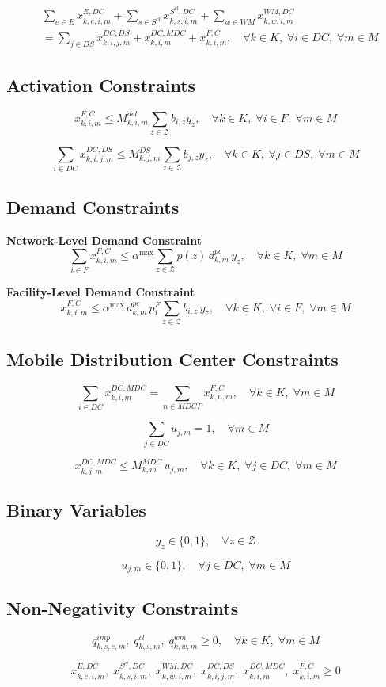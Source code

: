 \documentclass[12pt]{article}
\begin{document}
\begin{align*}
& \sum_{e \in E} x^{E,DC}_{k,e,i,m}
+ \sum_{s \in S^{cl}} x^{S^{cl},DC}_{k,s,i,m}
+ \sum_{w \in WM} x^{WM,DC}_{k,w,i,m} \\
& =
\sum_{j \in DS} x^{DC,DS}_{k,i,j,m}
+ x^{DC,MDC}_{k,i,m}
+ x^{F,C}_{k,i,m},
\quad \forall k \in K,\; \forall i \in DC,\; \forall m \in M
\end{align*}

\subsection{Activation Constraints}

\[
x^{F,C}_{k,i,m}
\leq
M^{del}_{k,i,m}
\sum_{z \in \mathcal{Z}} b_{i,z} y_z,
\quad \forall k \in K,\; \forall i \in F,\; \forall m \in M
\]

\[
\sum_{i \in DC} x^{DC,DS}_{k,i,j,m}
\leq
M^{DS}_{k,j,m}
\sum_{z \in \mathcal{Z}} b_{j,z} y_z,
\quad \forall k \in K,\; \forall j \in DS,\; \forall m \in M
\]

\subsection{Demand Constraints}

\textbf{Network-Level Demand Constraint}
\[
\sum_{i \in F} x^{F,C}_{k,i,m}
\le
\alpha^{\max}
\sum_{z \in \mathcal{Z}} p(z)\, d^{pc}_{k,m}\, y_z,
\quad \forall k \in K,\; \forall m \in M
\]

\textbf{Facility-Level Demand Constraint}
\[
x^{F,C}_{k,i,m}
\le
\alpha^{\max}\, d^{pc}_{k,m}\, p_i^{F}
\sum_{z \in \mathcal{Z}} b_{i,z} \, y_z,
\quad \forall k \in K,\; \forall i \in F,\; \forall m \in M
\]

\subsection{Mobile Distribution Center Constraints}

\[
\sum_{i \in DC} x^{DC,MDC}_{k,i,m}
=
\sum_{n \in MDCP} x^{F,C}_{k,n,m},
\quad \forall k \in K,\; \forall m \in M
\]

\[
\sum_{j \in DC} u_{j,m} = 1,
\quad \forall m \in M
\]

\[
x^{DC,MDC}_{k,j,m}
\leq
M^{MDC}_{k,m}\,u_{j,m},
\quad \forall k \in K,\; \forall j \in DC,\; \forall m \in M
\]
\subsection{Binary Variables}

\[
y_z \in \{0,1\},
\quad \forall z \in \mathcal{Z}
\]

\[
u_{j,m} \in \{0,1\},
\quad \forall j \in DC, \; \forall m \in M
\]

\subsection{Non-Negativity Constraints}

\[
q^{imp}_{k,s,e,m},\;
q^{cl}_{k,s,m},\;
q^{wm}_{k,w,m}
\geq 0,
\quad \forall k \in K,\; \forall m \in M
\]

\[
x^{E,DC}_{k,e,i,m},\;
x^{S^{cl},DC}_{k,s,i,m},\;
x^{WM,DC}_{k,w,i,m},\;
x^{DC,DS}_{k,i,j,m},\;
x^{DC,MDC}_{k,i,m},\;
x^{F,C}_{k,i,m}
\geq 0
\]
\end{document}
